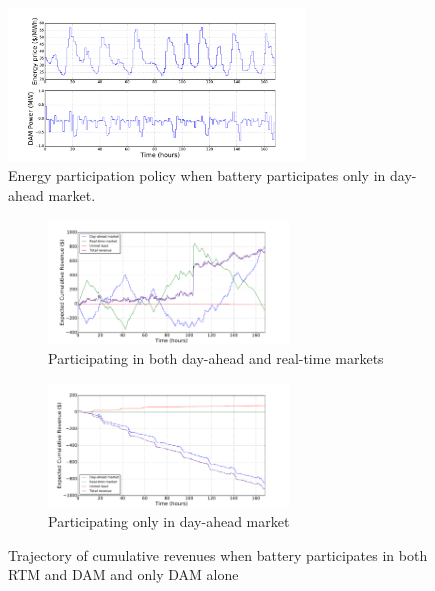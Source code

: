 \documentclass[11pt,twoside]{article}
\begin{document}
\begin{figure}[h!]
\begin{center}
\includegraphics[width=0.7\textwidth]
{Figures/Plots/onlydam/Pdam_fp_st.pdf} \caption{Energy participation policy when battery participates only in day-ahead market.}\label{fig:Pdam_onlydam}\end{center}
\end{figure}
\FloatBarrier
\begin{figure}[h!]
\begin{subfigure}[b]{\textwidth}
\centering
\includegraphics[width=0.7\textwidth]{Figures/Plots/fullproblem_stoch/cumulative_rev_fp_st.pdf} \caption{Participating in both day-ahead and real-time markets}\label{fig:cumulative_rev_fp_st}
\end{subfigure}\hfill
\begin{subfigure}[b]{\textwidth}
\centering
\includegraphics[width=0.7\textwidth]
{Figures/Plots/onlydam/cumulative_rev_fp_st.pdf} \caption{Participating only in day-ahead market}\label{fig:cumulative_rev_onlydam}
\end{subfigure}
\caption{Trajectory of cumulative revenues when battery participates in both RTM and DAM and only DAM alone}
\end{figure}
\end{document}
